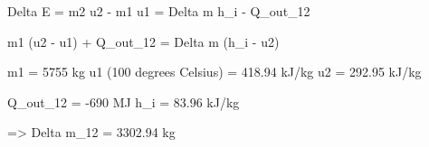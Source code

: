 Delta E = m2 u2 - m1 u1 = Delta m h_i - Q_out_12  

m1 (u2 - u1) + Q_out_12 = Delta m (h_i - u2)  

m1 = 5755 kg  
u1 (100 degrees Celsius) = 418.94 kJ/kg  
u2 = 292.95 kJ/kg  

Q_out_12 = -690 MJ  
h_i = 83.96 kJ/kg  

=> Delta m_12 = 3302.94 kg